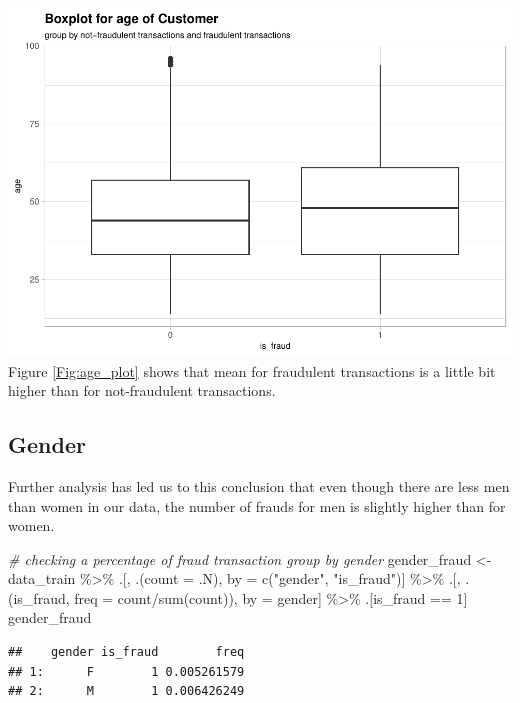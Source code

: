\documentclass[
]{report}
\newenvironment{Shaded}{\begin{snugshade}}{\end{snugshade}}
\newcommand{\AttributeTok}[1]{\textcolor[rgb]{0.77,0.63,0.00}{#1}}
\newcommand{\CommentTok}[1]{\textcolor[rgb]{0.56,0.35,0.01}{\textit{#1}}}
\newcommand{\DecValTok}[1]{\textcolor[rgb]{0.00,0.00,0.81}{#1}}
\newcommand{\FunctionTok}[1]{\textcolor[rgb]{0.00,0.00,0.00}{#1}}
\newcommand{\NormalTok}[1]{#1}
\newcommand{\OtherTok}[1]{\textcolor[rgb]{0.56,0.35,0.01}{#1}}
\newcommand{\SpecialCharTok}[1]{\textcolor[rgb]{0.00,0.00,0.00}{#1}}
\newcommand{\StringTok}[1]{\textcolor[rgb]{0.31,0.60,0.02}{#1}}
\begin{document}
\includegraphics{credit_card_fraud_detection_files/figure-latex/age_plot-1.pdf}
Figure \ref{Fig:age_plot} shows that mean for fraudulent transactions is
a little bit higher than for not-fraudulent transactions.

\hypertarget{gender}{%
\subsection{Gender}\label{gender}}

Further analysis has led us to this conclusion that even though there
are less men than women in our data, the number of frauds for men is
slightly higher than for women.

\begin{Shaded}
\begin{Highlighting}[]
\CommentTok{\# checking a percentage of fraud transaction group by gender}
\NormalTok{gender\_fraud }\OtherTok{\textless{}{-}}\NormalTok{ data\_train }\SpecialCharTok{\%\textgreater{}\%} 
\NormalTok{  .[, .(}\AttributeTok{count =}\NormalTok{ .N), by }\OtherTok{=} \FunctionTok{c}\NormalTok{(}\StringTok{"gender"}\NormalTok{, }\StringTok{"is\_fraud"}\NormalTok{)] }\SpecialCharTok{\%\textgreater{}\%}
\NormalTok{  .[, .(is\_fraud, }\AttributeTok{freq =}\NormalTok{ count}\SpecialCharTok{/}\FunctionTok{sum}\NormalTok{(count)), by }\OtherTok{=}\NormalTok{ gender] }\SpecialCharTok{\%\textgreater{}\%}
\NormalTok{  .[is\_fraud }\SpecialCharTok{==} \DecValTok{1}\NormalTok{]}
\NormalTok{gender\_fraud}
\end{Highlighting}
\end{Shaded}

\begin{verbatim}
##    gender is_fraud        freq
## 1:      F        1 0.005261579
## 2:      M        1 0.006426249
\end{verbatim}
\end{document}
